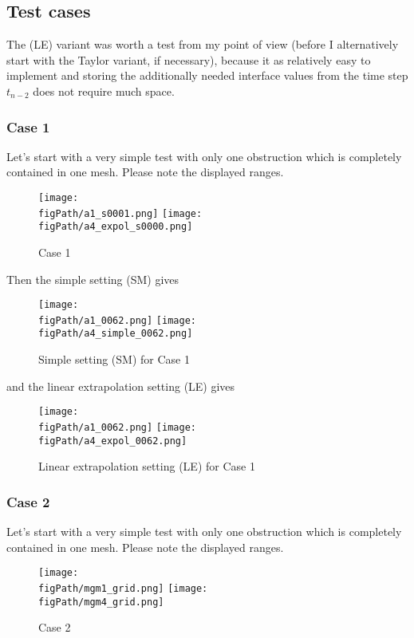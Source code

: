 
\subsection{Test cases}
The (LE) variant was worth a test from my point of view (before I alternatively start with the Taylor variant, if necessary), because it as relatively easy to implement and storing the additionally needed interface values from the time step $t_{n-2}$ does not require much space. 
\newpage
\subsubsection{Case 1}
Let's start with a very simple test with only one obstruction which is completely contained in one mesh. Please note the displayed ranges.
\begin{figure}[H]
\begin{center}
\texttt{[image: \\figPath/a1\_s0001.png]}
\texttt{[image: \\figPath/a4\_expol\_s0000.png]}
\end{center}
\caption{Case 1}
\label{FIG_MGM_Grid}
\end{figure}

Then the simple setting (SM) gives

\begin{figure}[H]
\begin{center}
\texttt{[image: \\figPath/a1\_0062.png]}
\texttt{[image: \\figPath/a4\_simple\_0062.png]}
\end{center}
\caption{Simple setting (SM) for Case 1}
\label{FIG_MGM_Grid}
\end{figure}


and the linear extrapolation setting (LE) gives

\begin{figure}[H]
\begin{center}
\texttt{[image: \\figPath/a1\_0062.png]}
\texttt{[image: \\figPath/a4\_expol\_0062.png]}
\end{center}
\caption{Linear extrapolation setting (LE) for Case 1}
\label{FIG_MGM_Grid}
\end{figure}


\subsubsection{Case 2}
Let's start with a very simple test with only one obstruction which is completely contained in one mesh. Please note the displayed ranges.
\begin{figure}[H]
\begin{center}
\texttt{[image: \\figPath/mgm1\_grid.png]}
\texttt{[image: \\figPath/mgm4\_grid.png]}
\end{center}
\caption{Case 2}
\label{FIG_MGM_Grid}
\end{figure}

